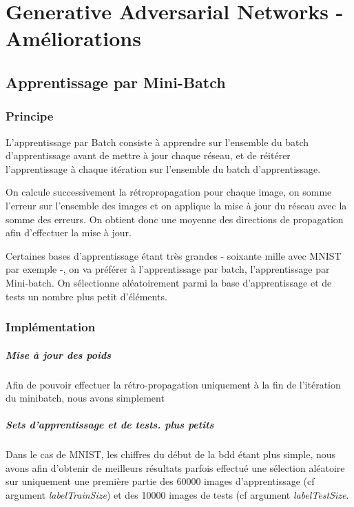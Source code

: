 \chapter{Generative Adversarial Networks - Améliorations}


\section{Apprentissage par Mini-Batch}
\subsection{Principe}
L'apprentissage par Batch consiste à apprendre sur l'ensemble du batch d'apprentissage avant de mettre à jour chaque réseau, et de réitérer l'apprentissage à chaque itération sur l'ensemble du batch d'apprentissage.

On calcule successivement la rétropropagation pour chaque image, on somme l'erreur sur l'ensemble des images et on applique la mise à jour du réseau avec la somme des erreurs. On obtient donc une moyenne des directions de propagation afin d'effectuer la mise à jour.

Certaines bases d'apprentissage étant très grandes - soixante mille avec MNIST par exemple -, on va préférer à l'apprentissage par batch, l'apprentissage par Mini-batch. 
On sélectionne aléatoirement parmi la base d'apprentissage et de tests un nombre plus petit d'éléments.
\subsection{Implémentation}
\paragraph{Mise à jour des poids}
Afin de pouvoir effectuer la rétro-propagation uniquement à la fin de l'itération du minibatch, nous avons simplement 

\paragraph{Sets d'apprentissage et de tests. plus petits}
Dans le cas de MNIST, les chiffres du début de la bdd étant plus simple, nous avons afin d'obtenir de meilleurs résultats parfois effectué une sélection aléatoire sur uniquement une première partie des 60000 images d'apprentissage (cf argument \textit{labelTrainSize}) et des 10000 images de tests (cf argument \textit{labelTestSize}.

